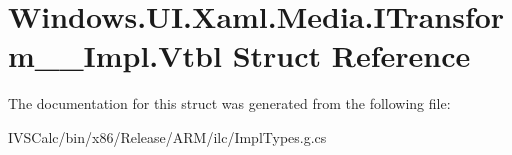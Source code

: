 \hypertarget{struct_windows_1_1_u_i_1_1_xaml_1_1_media_1_1_i_transform_____impl_1_1_vtbl}{}\section{Windows.\+U\+I.\+Xaml.\+Media.\+I\+Transform\+\_\+\+\_\+\+Impl.\+Vtbl Struct Reference}
\label{struct_windows_1_1_u_i_1_1_xaml_1_1_media_1_1_i_transform_____impl_1_1_vtbl}


The documentation for this struct was generated from the following file\+:\begin{DoxyCompactItemize}
\item 
I\+V\+S\+Calc/bin/x86/\+Release/\+A\+R\+M/ilc/Impl\+Types.\+g.\+cs\end{DoxyCompactItemize}
